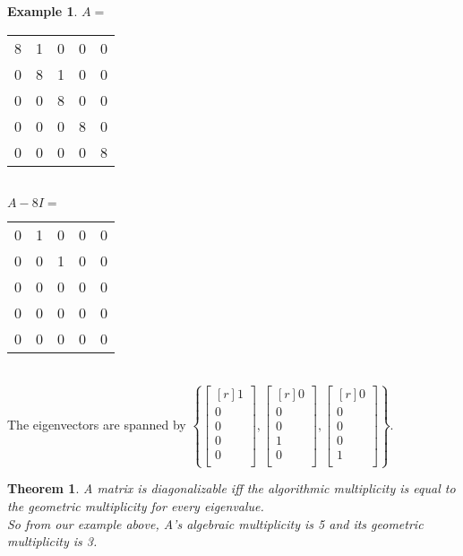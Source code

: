\documentclass{report}
\theoremstyle{plain}
\newtheorem*{thrm}{Theorem}
\theoremstyle{definition}
\newtheorem*{ex}{Example}
\theoremstyle{plain}
\begin{document}
\begin{ex}
$A=$
\begin{tabular}{ccc|c|c}
8&1&0&0&0\\
0&8&1&0&0\\
0&0&8&0&0\\
\hline
0&0&0&8&0\\
\hline
0&0&0&0&8\\
\end{tabular}\\
$A-8I =$
\begin{tabular}{ccc|c|c}
0&1&0&0&0\\
0&0&1&0&0\\
0&0&0&0&0\\
\hline
0&0&0&0&0\\
\hline
0&0&0&0&0\\
\end{tabular}\\
The eigenvectors are spanned by $\left\{ \begin{bmatrix}[r]1\\0\\0\\0\\0\\\end{bmatrix},\begin{bmatrix}[r]0\\0\\0\\1\\0\\\end{bmatrix},\begin{bmatrix}[r]0\\0\\0\\0\\1\\\end{bmatrix}\right\}$.
\end{ex}
\begin{thrm}
A matrix is diagonalizable iff the algorithmic multiplicity is equal to the geometric multiplicity for every eigenvalue.\\
So from our example above, A's algebraic multiplicity is 5 and its geometric multiplicity is 3.
\end{thrm}
\end{document}
